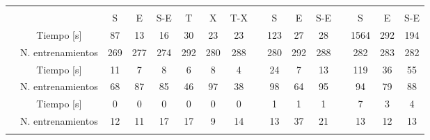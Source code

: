 %
\begin{table}
  \tableStyle
  \smaller
  \begin{tabular}{ccSSSSSScSSScSSS}
    \toprule
    && 
    && 
    && \\
    \cmidrule(lr){3-8}\cmidrule(lr){10-12}\cmidrule(lr){14-16} &&
    {S} & {E} &{S-E}& {T} & {X} &{T-X}&& {S} & {E} &{S-E}&& {S} & {E} &{S-E}\\
    \midrule
     & Tiempo [s] &
    87  & 13  & 16  & 30  & 23  & 23  && 123 & 27  & 28  &&1564 & 292 & 194 \\
    \cmidrule(lr){2-16} & N. entrenamientos &
    269 & 277 & 274 & 292 & 280 & 288 && 280 & 292 & 288 && 282 & 283 & 282 \\
    \midrule
     & Tiempo [s] &
    11  & 7   & 8   & 6   & 8   & 4   && 24  & 7   & 13  && 119 & 36  & 55  \\
    \cmidrule(lr){2-16} & N. entrenamientos &
    68  & 87  & 85  & 46  & 97  & 38  && 98  & 64  & 95  && 94  & 79  & 88  \\
    \midrule
     & Tiempo [s] &
    0   &   0 & 0   & 0   & 0   & 0   && 1   & 1   & 1   && 7   & 3   & 4   \\
    \cmidrule(lr){2-16} & N. entrenamientos &
    12  & 11  & 17  & 17  & 9   & 14  && 13  & 37  & 21  && 13  & 12  & 13  \\
    \bottomrule
    \\
    \end{tabular}

\end{table}
